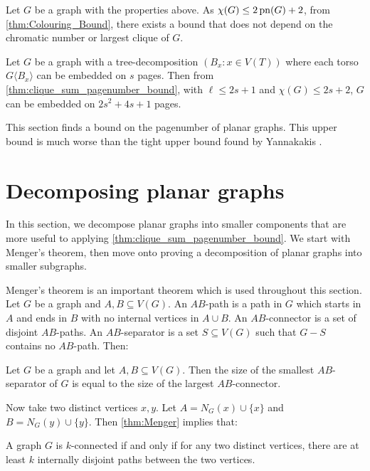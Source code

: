 Let $G$ be a graph with the properties above. As \(\chi(G) \leq 2 \operatorname{pn}(G) + 2\), from \cref{thm:Colouring_Bound}, there exists a bound that does not depend on the chromatic number or largest clique of \(G\).
\begin{corollary}\label{corr:bded_pn_tree_decomp}
	Let \(G\) be a graph with a tree-decomposition \((B_x: x \in V(T))\) where each torso \(G \langle B_x \rangle\) can be embedded on $s$ pages. Then from \cref{thm:clique_sum_pagenumber_bound}, with $\ell \leq 2s + 1$ and $\chi(G) \leq 2 s + 2$, \(G\) can be embedded on \(2s^2 + 4s + 1\) pages.
\end{corollary}

This section finds a bound on the pagenumber of planar graphs. This upper bound is much worse than the tight upper bound found by Yannakakis \cite{yannakakisEmbeddingPlanarGraphs1989}. 

\section{Decomposing planar graphs}
In this section, we decompose planar graphs into smaller components that are more useful to applying \cref{thm:clique_sum_pagenumber_bound}. We start with Menger's theorem, then move onto proving a decomposition of planar graphs into smaller subgraphs. 

Menger's theorem \cite{mengerZurAllgemeinenKurventheorie1927} is an important theorem which is used throughout this section. 
Let \(G\) be a graph and \(A, B \subseteq V(G)\). An \(AB\)-path is a path in \(G\) which starts in \(A\) and ends in \(B\) with no internal vertices in \(A \cup B\). An \(AB\)-connector is a set of disjoint \(AB\)-paths. An \(AB\)-separator is a set \(S \subseteq V(G)\) such that \(G - S\) contains no \(AB\)-path. Then:
\begin{theorem}\label{thm:Menger}
	Let $G$ be a graph and let $A, B \subseteq V(G)$. Then the size of the smallest \(AB\)-separator of \(G\) is equal to the size of the largest \(AB\)-connector.
\end{theorem}
Now take two distinct vertices \(x, y\). Let \(A = N_G(x) \cup \{x\} \) and \(B = N_G(y) \cup \{y\} \). Then \cref{thm:Menger} implies that:
\begin{theorem}\label{thm:Menger_Vertex}
	A graph \(G\) is \(k\)-connected if and only if for any two distinct vertices, there are at least \(k\) internally disjoint paths between the two vertices.
\end{theorem}

